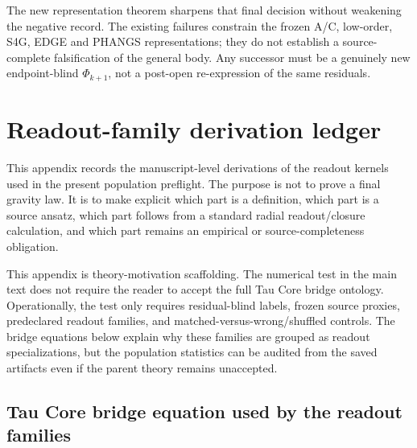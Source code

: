 \documentclass[11pt]{article}
\begin{document}
The new representation theorem sharpens that final decision without weakening
the negative record.  The existing failures constrain the frozen A/C,
low-order, S4G, EDGE and PHANGS representations; they do not establish a
source-complete falsification of the general body.  Any successor must be a
genuinely new endpoint-blind \(\Phi_{k+1}\), not a post-open re-expression of
the same residuals.

\appendix
\section{Readout-family derivation ledger}
\label{app:readout-derivations}

This appendix records the manuscript-level derivations of the readout kernels
used in the present population preflight.  The purpose is not to prove a final
gravity law.  It is to make explicit which part is a definition, which part is
a source ansatz, which part follows from a standard radial readout/closure
calculation, and which part remains an empirical or source-completeness
obligation.

This appendix is theory-motivation scaffolding.  The numerical test in the main
text does not require the reader to accept the full Tau Core bridge ontology.
Operationally, the test only requires residual-blind labels, frozen source
proxies, predeclared readout families, and matched-versus-wrong/shuffled
controls.  The bridge equations below explain why these families are grouped
as readout specializations, but the population statistics can be audited from
the saved artifacts even if the parent theory remains unaccepted.

\noindent{}

\subsection{Tau Core bridge equation used by the readout families}
\end{document}
